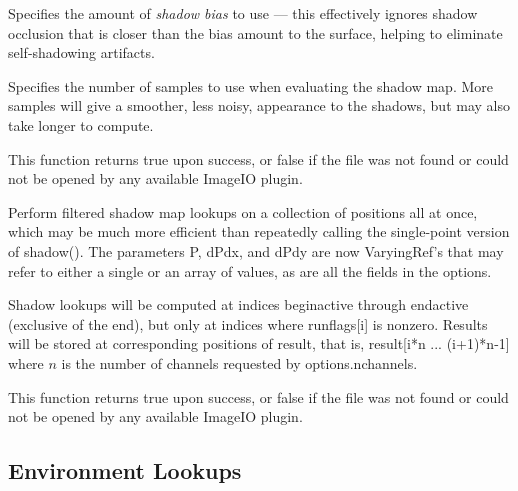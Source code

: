 \vspace{-24pt}
\vspace{10pt}
Specifies the amount of \emph{shadow bias} to use --- this effectively
ignores shadow occlusion that is closer than the bias amount to the
surface, helping to eliminate self-shadowing artifacts.
\apiend

\vspace{-24pt}
\vspace{10pt}
Specifies the number of samples to use when evaluating the shadow map.
More samples will give a smoother, less noisy, appearance to the
shadows, but may also take longer to compute.
\apiend

This function returns {\cf true} upon success, or {\cf false} if the
file was not found or could not be opened by any available ImageIO
plugin.
\apiend


Perform filtered shadow map lookups on a collection of positions all at
once, which may be much more efficient than repeatedly calling the
single-point version of {\cf shadow()}.  The parameters {\cf P},
{\cf dPdx}, and {\cf dPdy} are now
{\cf VaryingRef}'s that may refer to either a single or an array of
values, as are all the fields in the {\cf options}.

Shadow lookups will be computed at indices {\cf beginactive} through
{\cf endactive} (exclusive of the end), but only at indices where {\cf runflags[i]}
is nonzero.  Results will be stored at corresponding positions of
{\cf result}, that is, {\cf result[i*n ... (i+1)*n-1]} where $n$ 
is the number of channels requested by {\cf options.nchannels}.

This function returns {\cf true} upon success, or {\cf false} if the
file was not found or could not be opened by any available ImageIO
plugin.
\apiend

\newpage
\subsection{Environment Lookups}
\label{sec:texturesys:api:environment}

